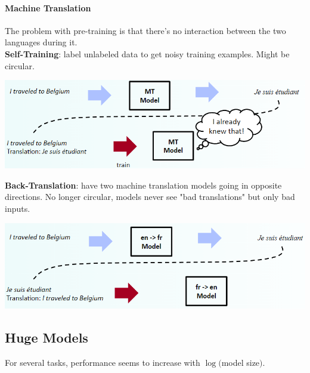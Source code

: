 \documentclass[10pt]{report}
\begin{document}
\paragraph{Machine Translation} The problem with pre-training is that there's no interaction between the two languages during it.\\
\textbf{Self-Training}: label unlabeled data to get noisy training examples. Might be circular.
\begin{center}
	\includegraphics[scale=0.5]{144.png}
\end{center}
\textbf{Back-Translation}: have two machine translation models going in opposite directions. No longer circular, models never see "bad translations" but only bad inputs.
\begin{center}
	\includegraphics[scale=0.5]{145.png}
\end{center}
\subsection{Huge Models} For several tasks, performance seems to increase with $\log($model size$)$.
\end{document}
